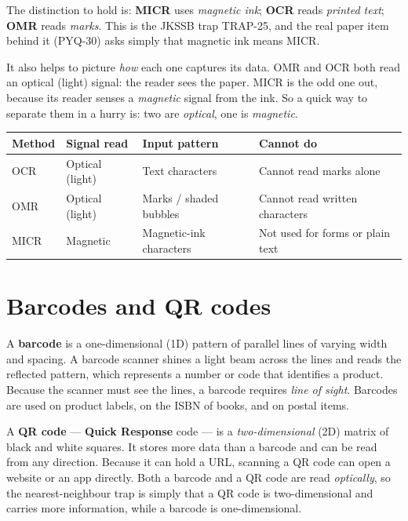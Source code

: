 \documentclass[11pt]{article}
\begin{document}
The distinction to hold is: \textbf{MICR} uses \emph{magnetic ink};
\textbf{OCR} reads \emph{printed text}; \textbf{OMR} reads \emph{marks}. This
is the JKSSB trap TRAP-25, and the real paper item behind it (PYQ-30) asks
simply that magnetic ink means MICR.

It also helps to picture \emph{how} each one captures its data. OMR and OCR
both read an optical (light) signal: the reader sees the paper. MICR is the
odd one out, because its reader senses a \emph{magnetic} signal from the ink.
So a quick way to separate them in a hurry is: two are \emph{optical}, one is
\emph{magnetic}.

\begin{center}
\begin{tabular}{p{}p{}p{}p{}}
\toprule
\textbf{Method} & \textbf{Signal read} & \textbf{Input pattern} & \textbf{Cannot do} \\
\midrule
OCR & Optical (light) & Text characters & Cannot read marks alone \\
OMR & Optical (light) & Marks / shaded bubbles & Cannot read written characters \\
MICR & Magnetic & Magnetic-ink characters & Not used for forms or plain text \\
\bottomrule
\end{tabular}
\end{center}

\section{Barcodes and QR codes}
A \textbf{barcode} is a one-dimensional (1D) pattern of parallel lines of
varying width and spacing. A barcode scanner shines a light beam across the
lines and reads the reflected pattern, which represents a number or code
that identifies a product. Because the scanner must see the lines, a barcode
requires \emph{line of sight}. Barcodes are used on product labels, on the
ISBN of books, and on postal items.

A \textbf{QR code} --- \textbf{Quick Response} code --- is a
\emph{two-dimensional} (2D) matrix of black and white squares. It stores
more data than a barcode and can be read from any direction. Because it can
hold a URL, scanning a QR code can open a website or an app directly. Both a
barcode and a QR code are read \emph{optically}, so the nearest-neighbour
trap is simply that a QR code is two-dimensional and carries more
information, while a barcode is one-dimensional.
\end{document}
